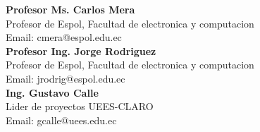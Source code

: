 \documentclass[11pt,a4paper]{moderncv}{}
\begin{document}
%
%
\textbf{Profesor Ms. Carlos Mera \ \ \ \ \ \ \ \ \ \ \ \ \ \ \ \ \ \ \ \ \ \ \ \ \ \ } \\
Profesor de Espol, Facultad de electronica y computacion\\
 Email: cmera@espol.edu.ec \\


\textbf{Profesor Ing. Jorge Rodriguez \ \ \ \ \ \ \ \ \ \ \ \ \ \ \ \ \ \ \ \ \ \ \ \ \ \ } \\
Profesor de Espol, Facultad de electronica y computacion\\
 Email: jrodrig@espol.edu.ec \\
%
\cvitem{}{} %
\textbf{Ing. Gustavo Calle \ \ \ \ \ \ \ \ \ \ \ \ \ \ \ \ \ \ \ \ \ \ \ \ \ \ } \\
Lider de proyectos UEES-CLARO\\
Email: gcalle@uees.edu.ec
%

\closesection{}                   %
\end{document}
